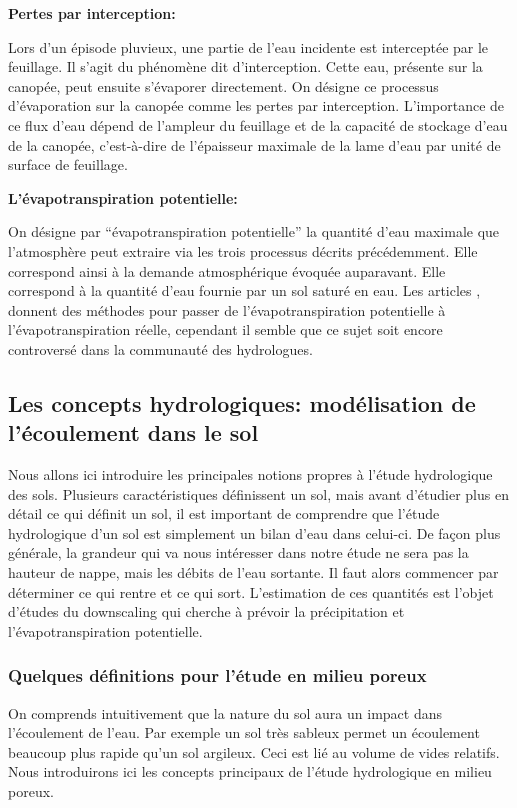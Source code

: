 \documentclass[a4paper,11pt]{article}
\numberwithin{equation}{section}
\begin{document}
\vspace{0.9cm}

\noindent\textbf{Pertes par interception:}

Lors d’un épisode pluvieux, une partie de l’eau incidente est interceptée par le feuillage. Il s’agit du phénomène dit d’interception. Cette eau, présente sur la canopée, peut ensuite s’évaporer directement. On désigne ce processus d’évaporation sur la canopée comme les pertes par interception. L’importance de ce flux d’eau dépend de l’ampleur du feuillage et de la capacité de stockage d’eau de la canopée, c’est-à-dire de l’épaisseur maximale de la lame d’eau par unité de surface de feuillage.

\vspace{0.7cm}

\noindent\textbf{L'évapotranspiration potentielle:}

On désigne par  ``évapotranspiration potentielle'' la quantité d’eau maximale que l’atmosphère peut extraire via les trois processus décrits précédemment. Elle correspond ainsi à la demande atmosphérique évoquée auparavant. Elle correspond à la quantité d'eau fournie par un sol saturé en eau. Les articles \cite{kristensen1975model}, \cite{zhifang2010estimation} donnent des méthodes pour passer de l'évapotranspiration potentielle à l'évapotranspiration réelle, cependant il semble que ce sujet soit encore controversé dans la communauté des hydrologues.  

\subsection{Les concepts hydrologiques: modélisation de l'écoulement dans le sol}
\label{hydro}

Nous allons ici introduire les principales notions propres à l'étude hydrologique des sols. Plusieurs caractéristiques définissent un sol, mais avant d'étudier  plus en détail ce qui définit un sol, il est important de comprendre que l'étude hydrologique d'un sol est simplement un bilan d'eau dans celui-ci. De façon plus générale, la grandeur qui va nous intéresser dans notre étude ne sera pas la hauteur de nappe, mais les débits de l'eau sortante.
Il faut alors commencer par déterminer ce qui rentre et ce qui sort. L'estimation de ces quantités est l'objet d'études du downscaling qui cherche à prévoir la précipitation et l'évapotranspiration potentielle.

\subsubsection{Quelques définitions pour l'étude en milieu poreux}
\label{ch: definition milieu poreux}
On comprends intuitivement que la nature du sol aura un impact dans l'écoulement de l'eau. Par exemple un sol très sableux permet un écoulement beaucoup plus rapide qu'un sol argileux. Ceci est lié au volume de vides relatifs. Nous introduirons ici les concepts principaux de l'étude hydrologique en milieu poreux.
\end{document}
